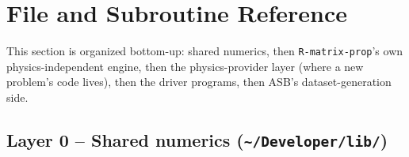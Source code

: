 \documentclass[11pt]{article}
\begin{document}
\section{File and Subroutine Reference}

This section is organized bottom-up: shared numerics, then \texttt{R-matrix-prop}'s own
physics-independent engine, then the physics-provider layer (where a new problem's code lives),
then the driver programs, then ASB's dataset-generation side.

\subsection{Layer 0 -- Shared numerics (\texttt{\textasciitilde/Developer/lib/})}
\end{document}
